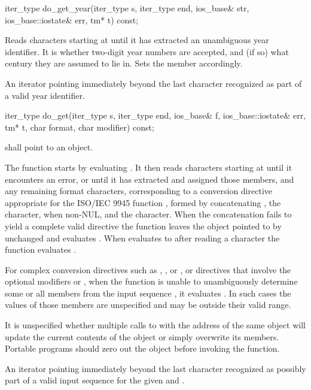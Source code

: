%
\begin{itemdecl}
iter_type do_get_year(iter_type s, iter_type end, ios_base& str,
                      ios_base::iostate& err, tm* t) const;
\end{itemdecl}

\begin{itemdescr}
\pnum
\effects
Reads characters starting at 
until it has extracted an unambiguous year identifier.
It is
 whether
two-digit year numbers are accepted,
and (if so) what century they are assumed to lie in.
Sets the
member accordingly.

\pnum
\returns
An iterator pointing immediately beyond the last character recognized
as part of a valid year identifier.
\end{itemdescr}

%
\begin{itemdecl}
iter_type do_get(iter_type s, iter_type end, ios_base& f,
                 ios_base::iostate& err, tm* t, char format, char modifier) const;
\end{itemdecl}

\begin{itemdescr}
\pnum
\requires
{} shall point to an object.

\pnum
\effects The function starts by evaluating
. It
then reads characters starting at  until it encounters an error, or
until it has extracted and assigned those  members, and any
remaining format characters, corresponding to a conversion directive
appropriate for the ISO/IEC 9945 function , formed by
concatenating , the  character,
when non-NUL, and the 
character. When the concatenation fails to yield a complete valid
directive the function leaves the object pointed to by  unchanged and
evaluates . When 
evaluates to  after reading a character the function evaluates
.

\pnum
For complex conversion directives such as ,
, or , or directives
that involve the optional modifiers  or ,
when the function is unable
to unambiguously determine some or all  members from the input
sequence , it evaluates .
In such cases the values of those  members are unspecified
and may be outside their valid range.

\pnum
\remarks It is unspecified whether multiple calls to
 with the
address of the same  object will update the current contents of
the object or simply overwrite its members. Portable programs should zero
out the object before invoking the function.

\pnum
\returns An iterator pointing immediately beyond the last character
recognized as possibly part of a valid input sequence for the given
 and .
\end{itemdescr}

